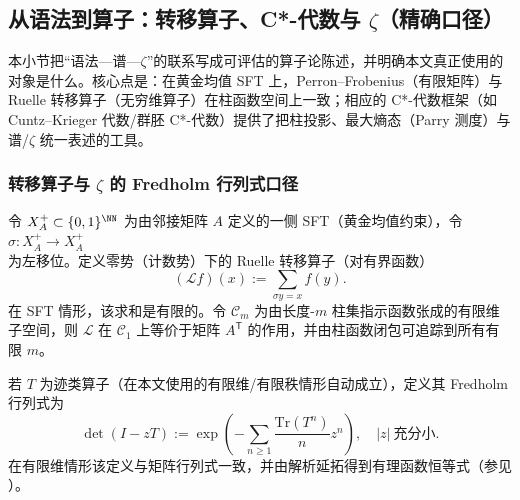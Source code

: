 \subsection{从语法到算子：转移算子、C*-代数与 \texorpdfstring{$\zeta$}{zeta}（精确口径）}\label{subsec:operator-zeta-interface}

本小节把“语法—谱—$\zeta$”的联系写成可评估的算子论陈述，并明确本文真正使用的对象是什么。核心点是：在黄金均值 SFT 上，Perron--Frobenius（有限矩阵）与 Ruelle 转移算子（无穷维算子）在柱函数空间上一致；相应的 C*-代数框架（如 Cuntz--Krieger 代数/群胚 C*-代数）提供了把柱投影、最大熵态（Parry 测度）与谱/$\zeta$ 统一表述的工具。

\subsubsection{转移算子与 \texorpdfstring{$\zeta$}{zeta} 的 Fredholm 行列式口径}

令 $X_A^+\subset\{0,1\}^{\NN}$ 为由邻接矩阵 $A$ 定义的一侧 SFT（黄金均值约束），令 $\sigma:X_A^+\to X_A^+$ 为左移位。定义零势（计数势）下的 Ruelle 转移算子（对有界函数）
\[
(\mathcal{L}f)(x):=\sum_{\sigma y=x} f(y).
\]
在 SFT 情形，该求和是有限的。令 $\mathcal{C}_m$ 为由长度-$m$ 柱集指示函数张成的有限维子空间，则 $\mathcal{L}$ 在 $\mathcal{C}_1$ 上等价于矩阵 $A^{\mathsf T}$ 的作用，并由柱函数闭包可追踪到所有有限 $m$。

\begin{definition}\label{def:fredholm-determinant}
若 $T$ 为迹类算子（在本文使用的有限维/有限秩情形自动成立），定义其 Fredholm 行列式为
\[
\det(I-zT):=\exp\left(-\sum_{n\ge 1}\frac{\mathrm{Tr}(T^n)}{n}z^n\right),
\quad |z|\ \text{充分小}.
\]
在有限维情形该定义与矩阵行列式一致，并由解析延拓得到有理函数恒等式（参见 \cite{Ruelle1976ZetaExpanding,ParryPollicott1990Zeta}）。
\end{definition}

